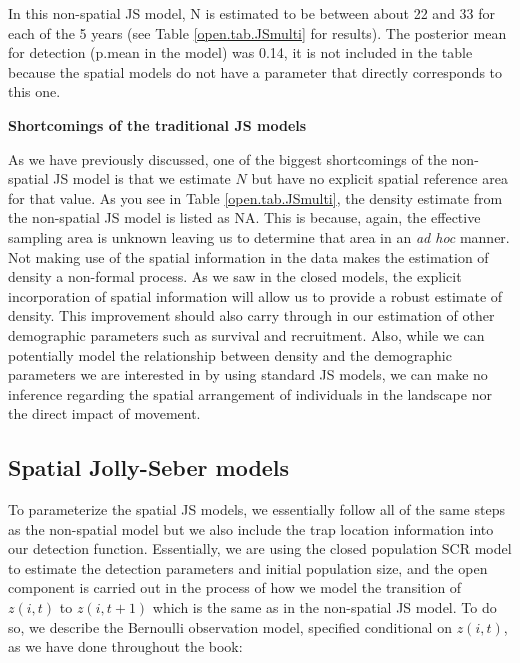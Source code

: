 In this non-spatial JS model, N is estimated to be between about 22 and 33 for each of the 5 years (see
Table \ref{open.tab.JSmulti} for results).  The posterior mean for 
detection (p.mean in the model) was 0.14, it
is not included in the table because the spatial models do not have 
a parameter that directly corresponds to this one.


{\bf Shortcomings of the traditional JS models}

As we have previously discussed, one of the biggest shortcomings of the non-spatial
JS model is that we estimate $N$ but have no explicit spatial reference area for that
value.  As you see in Table \ref{open.tab.JSmulti}, the density estimate from the non-spatial JS model
is listed as NA.  This is because, again, the effective sampling area is unknown leaving us to
determine that area in an { \it ad hoc} manner.
Not making use of the
spatial information in the data makes
the estimation of density
a non-formal process.  As we saw in the closed models, the explicit
incorporation of spatial information will allow us to provide a robust estimate of density.  
This improvement should
also carry through in our estimation of other demographic parameters
such as survival and recruitment.
Also, while we can potentially model the relationship between density and the
demographic parameters we are interested in by using standard JS models, we can make no
inference regarding the spatial arrangement of individuals in the landscape nor the direct
impact of movement.


\subsection{Spatial Jolly-Seber models}

To parameterize the spatial JS models, we essentially follow all of the same steps
as the non-spatial model but we also include the trap location information into our
detection function.  Essentially, we are using the closed population SCR model to estimate
the detection parameters and initial population size,
and the open component is carried out in the process of how we model the transition
of $z(i,t)$ to $z(i, t+1)$ which is the same as in the non-spatial JS model.
To do so, we describe the Bernoulli observation model,
specified conditional on $z(i,t)$, as we have done throughout the book:


